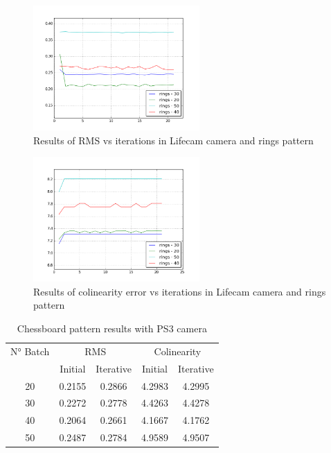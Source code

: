 \documentclass[journal]{IEEEtran}
\begin{document}
\begin{figure}[H]
\centering
\includegraphics[width=2.5in]{_img/report_4/img_results_lifecam_rings.png}
\caption{Results of RMS vs iterations in Lifecam camera and rings pattern}
\end{figure}

\begin{figure}[H]
\centering
\includegraphics[width=2.5in]{_img/report_4/img_results_lifecam_colinearity_rings.png}
\caption{Results of colinearity error vs iterations in Lifecam camera and rings pattern}
\end{figure}

\begin{table}[h]
\centering
\caption{Chessboard pattern results with PS3 camera}
\begin{tabular}{ |c||c|c|c|c|  }
 \hline
 N° Batch & \multicolumn{2}{c|}{RMS} & \multicolumn{2}{c|}{Colinearity}\\
 \cline{2-5}
 & Initial & Iterative & Initial & Iterative \\
 \hline
 20        & 0.2155 & 0.2866 & 4.2983 & 4.2995 \\
 30        & 0.2272 & 0.2778 & 4.4263 & 4.4278 \\
 40        & 0.2064 & 0.2661 & 4.1667 & 4.1762 \\
 50        & 0.2487 & 0.2784 & 4.9589 & 4.9507 \\
 \hline
\end{tabular}
\\
\end{table}
\end{document}
